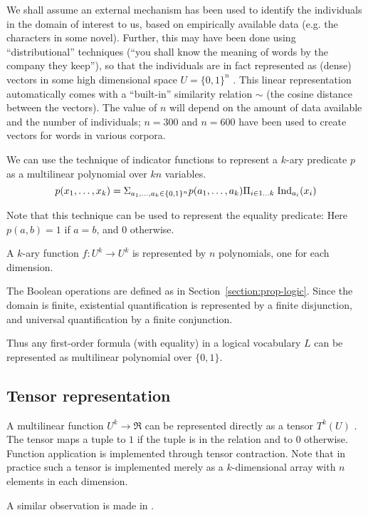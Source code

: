 \documentclass{article} %
\begin{document}
We shall assume an external mechanism has been used to identify the individuals in the domain of interest to us, based on empirically available data (e.g.{} the characters in some novel). Further, this may have been done using ``distributional'' techniques (``you shall know the meaning of words by the company they keep''), so that the individuals are in fact represented as (dense) vectors in some high dimensional space $U=\{0,1\}^n$ \cite{word-to-vec}. This linear representation automatically comes with a ``built-in'' similarity relation $\sim$ (the cosine distance between the vectors). The value of $n$ will depend on the amount of data available and the number of individuals; $n=300$ and $n=600$ have been used to create vectors for words in various corpora. 

We can use the technique of indicator functions to represent a $k$-ary predicate $p$ as a multilinear polynomial over $kn$ variables. 
$$p(x_1,\ldots, x_k)= \Sigma_{a_1,\ldots,a_k \in \{0,1\}^n} p(a_1, \ldots, a_k)  \Pi_{i \in 1\ldots k} \;\mbox{Ind}_{a_i}(x_i)$$

\noindent Note that this technique can be used to represent the equality predicate: Here $p(a,b)=1$ if $a=b$, and $0$ otherwise.

A $k$-ary function $f:U^k \rightarrow U^k$ is represented by $n$ polynomials, one for each dimension.

The Boolean operations are defined as in Section~\ref{section:prop-logic}. Since the domain is finite, existential quantification is represented by a finite disjunction, and universal quantification by a finite conjunction. 

Thus any first-order formula (with equality) in a logical vocabulary $L$ can be represented as multilinear polynomial over $\{0,1\}$. 

\subsection{Tensor representation}
A multilinear function $U^k \rightarrow \Re$ can be represented directly as a tensor $T^k(U)$ \cite[Chapter 8]{lee-book-2000}. The tensor maps a tuple  to $1$ if the tuple is in the relation and to $0$ otherwise. Function application is implemented through tensor contraction. Note that in practice such a tensor is implemented merely as a $k$-dimensional array with $n$ elements in each dimension. 

A similar observation is made in \cite{grefenstette-2013}.
\end{document}
